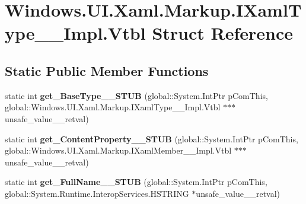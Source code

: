 \hypertarget{struct_windows_1_1_u_i_1_1_xaml_1_1_markup_1_1_i_xaml_type_____impl_1_1_vtbl}{}\section{Windows.\+U\+I.\+Xaml.\+Markup.\+I\+Xaml\+Type\+\_\+\+\_\+\+Impl.\+Vtbl Struct Reference}
\label{struct_windows_1_1_u_i_1_1_xaml_1_1_markup_1_1_i_xaml_type_____impl_1_1_vtbl}
\subsection*{Static Public Member Functions}
\begin{DoxyCompactItemize}
\item 
\mbox{\label{struct_windows_1_1_u_i_1_1_xaml_1_1_markup_1_1_i_xaml_type_____impl_1_1_vtbl_a3eabbdc6edd7e60a98ca2e1f1da8965c}} 
static int {\bfseries get\+\_\+\+Base\+Type\+\_\+\+\_\+\+S\+T\+UB} (global\+::\+System.\+Int\+Ptr p\+Com\+This, global\+::\+Windows.\+U\+I.\+Xaml.\+Markup.\+I\+Xaml\+Type\+\_\+\+\_\+\+Impl.\+Vtbl $\ast$$\ast$$\ast$unsafe\+\_\+value\+\_\+\+\_\+retval)
\item 
\mbox{\label{struct_windows_1_1_u_i_1_1_xaml_1_1_markup_1_1_i_xaml_type_____impl_1_1_vtbl_ada750449c85f0ee2addc461396c3694e}} 
static int {\bfseries get\+\_\+\+Content\+Property\+\_\+\+\_\+\+S\+T\+UB} (global\+::\+System.\+Int\+Ptr p\+Com\+This, global\+::\+Windows.\+U\+I.\+Xaml.\+Markup.\+I\+Xaml\+Member\+\_\+\+\_\+\+Impl.\+Vtbl $\ast$$\ast$$\ast$unsafe\+\_\+value\+\_\+\+\_\+retval)
\item 
\mbox{\label{struct_windows_1_1_u_i_1_1_xaml_1_1_markup_1_1_i_xaml_type_____impl_1_1_vtbl_a2968dc9d0e625f5da74b55b8a6c8179e}} 
static int {\bfseries get\+\_\+\+Full\+Name\+\_\+\+\_\+\+S\+T\+UB} (global\+::\+System.\+Int\+Ptr p\+Com\+This, global\+::\+System.\+Runtime.\+Interop\+Services.\+H\+S\+T\+R\+I\+NG $\ast$unsafe\+\_\+value\+\_\+\+\_\+retval)
\item 
\mbox{\label{struct_windows_1_1_u_i_1_1_xaml_1_1_markup_1_1_i_xaml_type_____impl_1_1_vtbl_ab8219cd3b1d3d3c3f585a6b8b8bfc195}} 

\end{DoxyCompactItemize}
